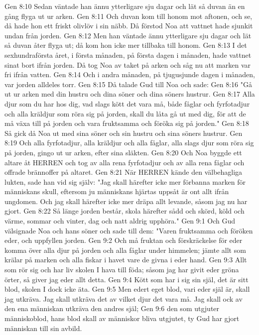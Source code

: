Gen 8:10  Sedan väntade han ännu ytterligare sju dagar och lät så duvan än en gång flyga ut ur arken.
Gen 8:11  Och duvan kom till honom mot aftonen, och se, då hade hon ett friskt olivlöv i sin näbb. Då förstod Noa att vattnet hade sjunkit undan från jorden.
Gen 8:12  Men han väntade ännu ytterligare sju dagar och lät så duvan åter flyga ut; då kom hon icke mer tillbaka till honom.
Gen 8:13  I det sexhundraförsta året, i första månaden, på första dagen i månaden, hade vattnet sinat bort ifrån jorden. Då tog Noa av taket på arken och såg nu att marken var fri ifrån vatten.
Gen 8:14  Och i andra månaden, på tjugusjunde dagen i månaden, var jorden alldeles torr.
Gen 8:15  Då talade Gud till Noa och sade:
Gen 8:16  "Gå ut ur arken med din hustru och dina söner och dina söners hustrur.
Gen 8:17  Alla djur som du har hos dig, vad slags kött det vara må, både fåglar och fyrfotadjur och alla kräldjur som röra sig på jorden, skall du låta gå ut med dig, för att de må växa till på jorden och vara fruktsamma och föröka sig på jorden."
Gen 8:18  Så gick då Noa ut med sina söner och sin hustru och sina söners hustrur.
Gen 8:19  Och alla fyrfotadjur, alla kräldjur och alla fåglar, alla slags djur som röra sig på jorden, gingo ut ur arken, efter sina släkten.
Gen 8:20  Och Noa byggde ett altare åt HERREN och tog av alla rena fyrfotadjur och av alla rena fåglar och offrade brännoffer på altaret.
Gen 8:21  När HERREN kände den välbehagliga lukten, sade han vid sig själv: "Jag skall härefter icke mer förbanna marken för människans skull, eftersom ju människans hjärtas uppsåt är ont allt ifrån ungdomen. Och jag skall härefter icke mer dräpa allt levande, såsom jag nu har gjort.
Gen 8:22  Så länge jorden består, skola härefter sådd och skörd, köld och värme, sommar och vinter, dag och natt aldrig upphöra."
Gen 9:1  Och Gud välsignade Noa och hans söner och sade till dem: "Varen fruktsamma och föröken eder, och uppfyllen jorden.
Gen 9:2  Och må fruktan och förskräckelse för eder komma över alla djur på jorden och alla fåglar under himmelen; jämte allt som krälar på marken och alla fiskar i havet vare de givna i eder hand.
Gen 9:3  Allt som rör sig och har liv skolen I hava till föda; såsom jag har givit eder gröna örter, så giver jag eder allt detta.
Gen 9:4  Kött som har i sig sin själ, det är sitt blod, skolen I dock icke äta.
Gen 9:5  Men edert eget blod, vari eder själ är, skall jag utkräva. Jag skall utkräva det av vilket djur det vara må. Jag skall ock av den ena människan utkräva den andres själ;
Gen 9:6  den som utgjuter människoblod, hans blod skall av människor bliva utgjutet, ty Gud har gjort människan till sin avbild.
